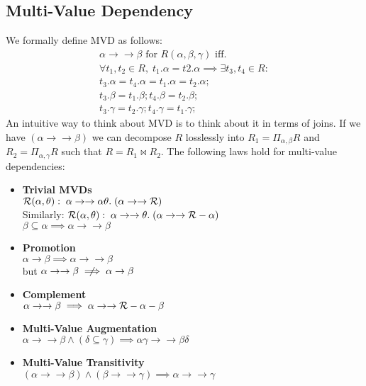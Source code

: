 \subsection{Multi-Value Dependency}
We formally define MVD as follows:
\begin{align*}
\alpha \to\to \beta \text{ for } R(\alpha, \beta, \gamma) \text{ iff.} \\
\forall t_1, t_2 \in R,\; t_1.\alpha = t2.\alpha \implies \exists t_3, t_4 \in R:\\
t_3.\alpha = t_4.\alpha = t_1.\alpha = t_2.\alpha; \\
t_3.\beta = t_1.\beta; t_4.\beta = t_2.\beta; \\
t_3.\gamma = t_2.\gamma; t_4.\gamma = t_1.\gamma;
\end{align*}
An intuitive way to think about MVD is to think about it in terms of joins. If we have $(\alpha \to\to \beta)$ we can decompose $R$ losslessly into $R_1 = \Pi_{\alpha, \beta}R$ and $R_2 = \Pi_{\alpha, \gamma}R$ such that $R = R_1 \Join R_2$.
The following laws hold for multi-value dependencies:
\begin{itemize}
\item \textbf{Trivial MVDs}\\
$\mathcal{R}(\alpha, \theta):\; \alpha \to\to \alpha\theta.\; (\alpha \to\to \mathcal{R})$\\
Similarly: $\mathcal{R}(\alpha, \theta):\; \alpha \to\to \theta.\; (\alpha \to\to \mathcal{R} - \alpha)$\\
$\beta \subseteq \alpha \implies \alpha \to\to \beta$
\item \textbf{Promotion}\\
$\alpha \to \beta \implies \alpha \to\to \beta$\\
but $\alpha \to\to \beta \centernot\implies \alpha  \to \beta$
\item \textbf{Complement}\\
$\alpha \to\to\beta \implies \alpha \to\to \mathcal{R} - \alpha -\beta$
\item \textbf{Multi-Value Augmentation}\\
$\alpha \to\to \beta \land (\delta \subseteq \gamma) \implies \alpha\gamma \to\to \beta\delta$
\item \textbf{Multi-Value Transitivity}\\
$(\alpha \to\to \beta) \land (\beta \to\to \gamma) \implies \alpha \to\to \gamma$
\end{itemize}

